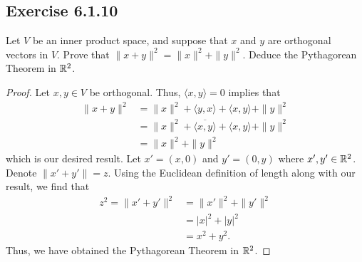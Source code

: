 \subsection*{Exercise 6.1.10}\label{Exercise 6.1.10} Let \( V  \) be an inner product space, and suppose that \( x  \) and \( y  \) are orthogonal vectors in \( V  \). Prove that \( \| x + y \|^{2} = \|x\|^{2} + \|y\|^{2}. \) Deduce the Pythagorean Theorem in \( \mathbb{R}^{2} \).
\begin{proof}
Let \( x,y \in V  \) be orthogonal. Thus, \( \langle x , y \rangle = 0 \) implies that
\begin{align*}
    \|x + y\|^{2}  &= \|x\|^{2} +  \langle y , x \rangle + \langle x , y \rangle + \|y\|^{2} \\
                  &= \|x\|^{2} + \overline{\langle x , y \rangle} + \langle x , y \rangle + \|y\|^{2} \\
                  &= \|x\|^{2} + \|y\|^{2}
\end{align*}
which is our desired result. Let \( x' = (x,0)  \) and \( y' = (0,y)  \) where \( x',y' \in \mathbb{R}^{2}  \). Denote \( \| x' + y' \| = z  \). Using the Euclidean definition of length along with our result, we find that 
\begin{align*}
    z^{2} = \| x' + y'\|^{2} &= \|x'\|^{2} + \|y'\|^{2}  \\
          &= | x |^{2} + | y |^{2} \\ 
          &= x^{2} + y^{2}.
\end{align*}
Thus, we have obtained the Pythagorean Theorem in \( \mathbb{R}^{2} \).
\end{proof}

